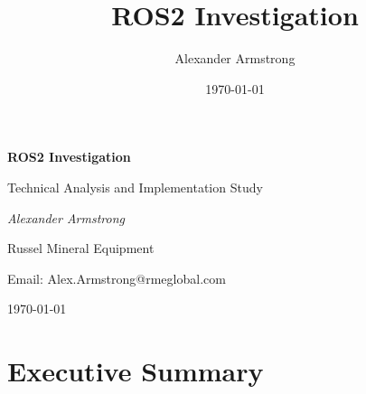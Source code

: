 \documentclass[10pt,a4paper,english]{article}
\title{ROS2 Investigation}
\author{Alexander Armstrong}
\date{\today}
\begin{document}
\begin{titlepage}
    \centering
    \vspace*{2cm}
    
    {\Huge\bfseries ROS2 Investigation\par}
    \vspace{1.5cm}
    
    {\Large Technical Analysis and Implementation Study\par}
    \vspace{2cm}
    
    {\large\itshape Alexander Armstrong\par}
    \vspace{1cm}
    
    {\large Russel Mineral Equipment\par}
    \vspace{0.5cm}
    
    {\large Email: Alex.Armstrong@rmeglobal.com\par}
    \vspace{2cm}
    
    \vfill
    
    {\large \today\par}
    
    \vspace{1cm}
    
\end{titlepage}

\tableofcontents
\newpage

\section{Executive Summary}
\end{document}
